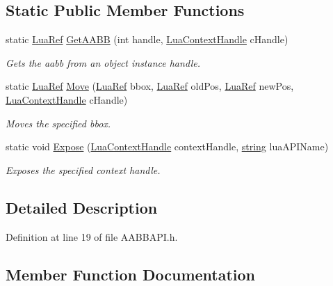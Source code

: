 \subsection*{Static Public Member Functions}
\begin{DoxyCompactItemize}
\item 
static \hyperlink{_lua_context_8h_a2220f03700ba40e366f0ee2d684d5c91}{Lua\+Ref} \hyperlink{class_a_a_b_b_a_p_i_ad3b7d97acd59d1a83b1cc1ecc1d6f3a3}{Get\+A\+A\+BB} (int handle, \hyperlink{_lua_context_8h_a2ffcc2d3ed21165072a1d7b61259bf14}{Lua\+Context\+Handle} c\+Handle)
\begin{DoxyCompactList}\small\item\em Gets the aabb from an object instance handle. \end{DoxyCompactList}\item 
static \hyperlink{_lua_context_8h_a2220f03700ba40e366f0ee2d684d5c91}{Lua\+Ref} \hyperlink{class_a_a_b_b_a_p_i_aa832a0bc68a14f90c48ac4cd85663371}{Move} (\hyperlink{_lua_context_8h_a2220f03700ba40e366f0ee2d684d5c91}{Lua\+Ref} bbox, \hyperlink{_lua_context_8h_a2220f03700ba40e366f0ee2d684d5c91}{Lua\+Ref} old\+Pos, \hyperlink{_lua_context_8h_a2220f03700ba40e366f0ee2d684d5c91}{Lua\+Ref} new\+Pos, \hyperlink{_lua_context_8h_a2ffcc2d3ed21165072a1d7b61259bf14}{Lua\+Context\+Handle} c\+Handle)
\begin{DoxyCompactList}\small\item\em Moves the specified bbox. \end{DoxyCompactList}\item 
static void \hyperlink{class_a_a_b_b_a_p_i_a42a1a851b7ade27307e59ae2717bee02}{Expose} (\hyperlink{_lua_context_8h_a2ffcc2d3ed21165072a1d7b61259bf14}{Lua\+Context\+Handle} context\+Handle, \hyperlink{_types_8h_ad453f9f71ce1f9153fb748d6bb25e454}{string} lua\+A\+P\+I\+Name)
\begin{DoxyCompactList}\small\item\em Exposes the specified context handle. \end{DoxyCompactList}\end{DoxyCompactItemize}


\subsection{Detailed Description}


Definition at line 19 of file A\+A\+B\+B\+A\+P\+I.\+h.



\subsection{Member Function Documentation}
